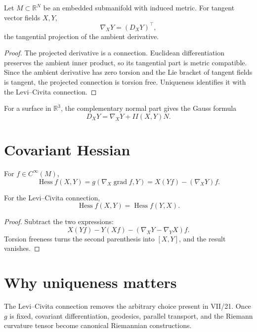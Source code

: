 \begin{theorem}\label{thm:vii22-projection}
Let \(M\subset\mathbb R^N\) be an embedded submanifold with induced metric.
For tangent vector fields \(X,Y\),
\[
\nabla_XY=(D_XY)^\top,
\]
the tangential projection of the ambient derivative.
\end{theorem}

\begin{proof}
The projected derivative is a connection.  Euclidean differentiation preserves the
ambient inner product, so its tangential part is metric compatible.  Since the
ambient derivative has zero torsion and the Lie bracket of tangent fields is
tangent, the projected connection is torsion free.  Uniqueness identifies it with
the Levi--Civita connection.
\end{proof}

For a surface in \(\mathbb R^3\), the complementary normal part gives the Gauss
formula
\[
D_XY=\nabla_XY+II(X,Y)N.
\]

\section{Covariant Hessian}

\begin{definition}[Hessian]\label{def:vii22-hessian}
For \(f\in C^\infty(M)\),
\[
\operatorname{Hess}f(X,Y)
=
g(\nabla_X\operatorname{grad}f,Y)
=
X(Yf)-(\nabla_XY)f.
\]
\end{definition}

\begin{proposition}\label{prop:vii22-hessian-symmetric}
For the Levi--Civita connection,
\[
\operatorname{Hess}f(X,Y)=\operatorname{Hess}f(Y,X).
\]
\end{proposition}

\begin{proof}
Subtract the two expressions:
\[
X(Yf)-Y(Xf)-(\nabla_XY-\nabla_YX)f.
\]
Torsion freeness turns the second parenthesis into \([X,Y]\), and the result
vanishes.
\end{proof}

\section{Why uniqueness matters}

The Levi--Civita connection removes the arbitrary choice present in VII/21.
Once \(g\) is fixed, covariant differentiation, geodesics, parallel transport, and
the Riemann curvature tensor become canonical Riemannian constructions.

